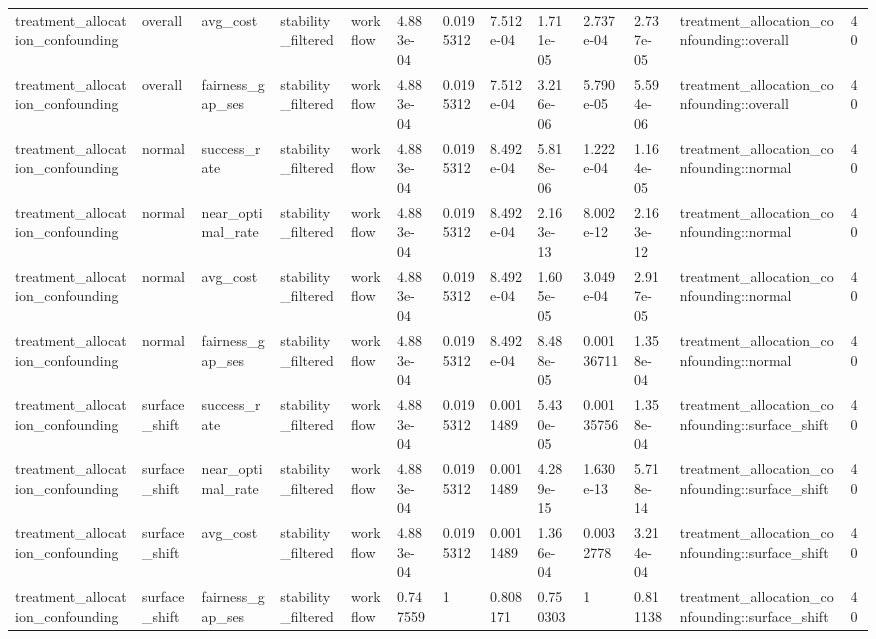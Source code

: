 \begin{tabular}{lllllllllllll}
treatment\_allocation\_confounding & overall & avg\_cost & stability\_filtered & workflow & 4.883e-04 & 0.0195312 & 7.512e-04 & 1.711e-05 & 2.737e-04 & 2.737e-05 & treatment\_allocation\_confounding::overall & 40 \\
treatment\_allocation\_confounding & overall & fairness\_gap\_ses & stability\_filtered & workflow & 4.883e-04 & 0.0195312 & 7.512e-04 & 3.216e-06 & 5.790e-05 & 5.594e-06 & treatment\_allocation\_confounding::overall & 40 \\
treatment\_allocation\_confounding & normal & success\_rate & stability\_filtered & workflow & 4.883e-04 & 0.0195312 & 8.492e-04 & 5.818e-06 & 1.222e-04 & 1.164e-05 & treatment\_allocation\_confounding::normal & 40 \\
treatment\_allocation\_confounding & normal & near\_optimal\_rate & stability\_filtered & workflow & 4.883e-04 & 0.0195312 & 8.492e-04 & 2.163e-13 & 8.002e-12 & 2.163e-12 & treatment\_allocation\_confounding::normal & 40 \\
treatment\_allocation\_confounding & normal & avg\_cost & stability\_filtered & workflow & 4.883e-04 & 0.0195312 & 8.492e-04 & 1.605e-05 & 3.049e-04 & 2.917e-05 & treatment\_allocation\_confounding::normal & 40 \\
treatment\_allocation\_confounding & normal & fairness\_gap\_ses & stability\_filtered & workflow & 4.883e-04 & 0.0195312 & 8.492e-04 & 8.488e-05 & 0.00136711 & 1.358e-04 & treatment\_allocation\_confounding::normal & 40 \\
treatment\_allocation\_confounding & surface\_shift & success\_rate & stability\_filtered & workflow & 4.883e-04 & 0.0195312 & 0.0011489 & 5.430e-05 & 0.00135756 & 1.358e-04 & treatment\_allocation\_confounding::surface\_shift & 40 \\
treatment\_allocation\_confounding & surface\_shift & near\_optimal\_rate & stability\_filtered & workflow & 4.883e-04 & 0.0195312 & 0.0011489 & 4.289e-15 & 1.630e-13 & 5.718e-14 & treatment\_allocation\_confounding::surface\_shift & 40 \\
treatment\_allocation\_confounding & surface\_shift & avg\_cost & stability\_filtered & workflow & 4.883e-04 & 0.0195312 & 0.0011489 & 1.366e-04 & 0.0032778 & 3.214e-04 & treatment\_allocation\_confounding::surface\_shift & 40 \\
treatment\_allocation\_confounding & surface\_shift & fairness\_gap\_ses & stability\_filtered & workflow & 0.747559 & 1 & 0.808171 & 0.750303 & 1 & 0.811138 & treatment\_allocation\_confounding::surface\_shift & 40 \\

\end{tabular}
